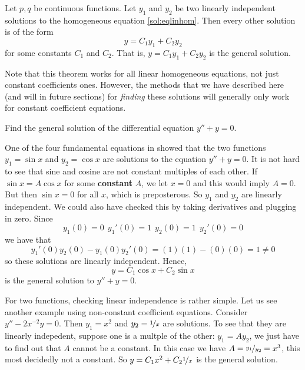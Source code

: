 \begin{theorem1}{}
Let $p, q$ be continuous functions.
Let $y_1$ and $y_2$ be two linearly independent
solutions to the homogeneous equation \eqref{sol:eqlinhom}. 
Then every other solution is 
of the form
\begin{equation*}
y = C_1 y_1 + C_2 y_2
\end{equation*} for some constants $C_1$ and $C_2$. That is, $y = C_1 y_1 + C_2 y_2$ is the general solution.
\end{theorem1}

Note that this theorem works for all linear homogeneous equations, not just constant coefficients ones. However, the methods that we have described here (and will in future sections) for \emph{finding} these solutions will generally only work for constant coefficient equations.

\begin{example}
Find the general solution of the differential equation $y'' + y = 0$.
\end{example}

\begin{exampleSol}
One of the four fundamental equations in  showed that the two functions $y_1 = \sin x$ and $y_2 = \cos x$ are solutions to the
equation $y'' + y = 0$.  It is not hard to see that sine and cosine are not
constant
multiples of each other.  If $\sin x = A \cos x$ for some \textbf{constant} $A$,
we let $x=0$ and this would imply $A = 0$.  But then $\sin x = 0$ for all
$x$, which is preposterous.
So $y_1$ and $y_2$ are linearly independent.  We could also have checked this by taking derivatives and plugging in zero. Since 
\begin{equation*}
y_1(0) = 0 \ \ y_1'(0) = 1\ \ y_2(0) = 1\ \ y_2'(0) = 0 
\end{equation*}
we have that
\begin{equation*}
y_1'(0)y_2(0) - y_1(0)y_2'(0) = (1)(1) - (0)(0) = 1 \neq 0
\end{equation*}
so these solutions are linearly independent. Hence,
\begin{equation*}
y = C_1 \cos x + C_2 \sin x 
\end{equation*}
is the general solution to $y'' + y = 0$.
\end{exampleSol}

For two functions, checking linear independence is rather simple.  Let us
see another example using non-constant coefficient equations.  Consider $y''-2x^{-2}y = 0$.  Then $y_1 = x^2$ and $y_2 =
\nicefrac{1}{x}$ are solutions.  To see that they are linearly indepedent,
suppose one is a multple of the other: $y_1 = A y_2$, we just have to find
out that $A$ cannot be a constant.  In this case we have $A =
\nicefrac{y_1}{y_2} = x^3$, this most decidedly not a constant.
So $y = C_1 x^2 + C_2 \nicefrac{1}{x}$ is the general solution.

